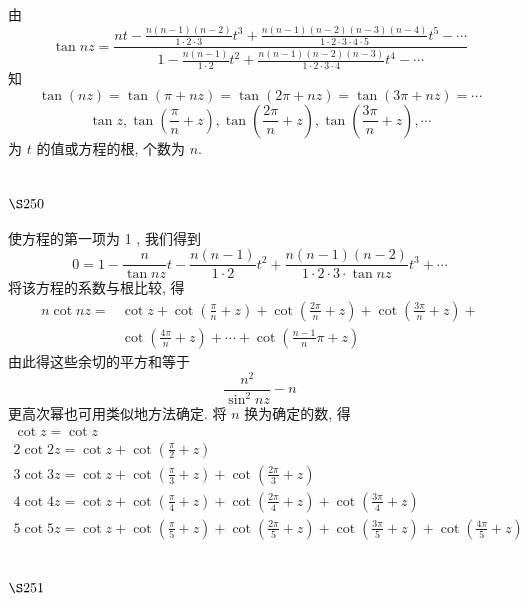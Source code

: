 由
\[
\tan n z=\frac{n t-\frac{n(n-1)(n-2)}{1 \cdot 2 \cdot 3} t^{3}+\frac{n(n-1)(n-2)(n-3)(n-4)}{1 \cdot 2 \cdot 3 \cdot 4 \cdot 5} t^{5}-\cdots}{1-\frac{n(n-1)}{1 \cdot 2} t^{2}+\frac{n(n-1)(n-2)(n-3)}{1 \cdot 2 \cdot 3 \cdot 4} t^{4}-\cdots}
\]
知
\[
\tan (n z)=\tan (\pi+n z)=\tan (2 \pi+n z)=\tan (3 \pi+n z)=\cdots
\]
\[
\tan z, \tan \left(\frac{\pi}{n}+z\right), \tan \left(\frac{2 \pi}{n}+z\right), \tan \left(\frac{3 \pi}{n}+z\right), \cdots
\]
为 $t$ 的值或方程的根, 个数为 $n$.

\section{$\S 250$}

使方程的第一项为 1 , 我们得到
\[
0=1-\frac{n}{\tan n z} t-\frac{n(n-1)}{1 \cdot 2} t^{2}+\frac{n(n-1)(n-2)}{1 \cdot 2 \cdot 3 \cdot \tan n z} t^{3}+\cdots
\]
将该方程的系数与根比较, 得
\[
\begin{aligned}
n \cot n z= & \cot z+\cot \left(\frac{\pi}{n}+z\right)+\cot \left(\frac{2 \pi}{n}+z\right)+\cot \left(\frac{3 \pi}{n}+z\right)+ \\
& \cot \left(\frac{4 \pi}{n}+z\right)+\cdots+\cot \left(\frac{n-1}{n} \pi+z\right)
\end{aligned}
\]
由此得这些余切的平方和等于
\[
\frac{n^{2}}{\sin ^{2} n z}-n
\]
更高次幂也可用类似地方法确定. 将 $n$ 换为确定的数, 得
\[
\begin{gathered}
\cot z=\cot z \\
2 \cot 2 z=\cot z+\cot \left(\frac{\pi}{2}+z\right) \\
3 \cot 3 z=\cot z+\cot \left(\frac{\pi}{3}+z\right)+\cot \left(\frac{2 \pi}{3}+z\right) \\
4 \cot 4 z=\cot z+\cot \left(\frac{\pi}{4}+z\right)+\cot \left(\frac{2 \pi}{4}+z\right)+\cot \left(\frac{3 \pi}{4}+z\right) \\
5 \cot 5 z=\cot z+\cot \left(\frac{\pi}{5}+z\right)+\cot \left(\frac{2 \pi}{5}+z\right)+\cot \left(\frac{3 \pi}{5}+z\right)+\cot \left(\frac{4 \pi}{5}+z\right) 
\end{gathered}
\]
\section{$\S 251$}

